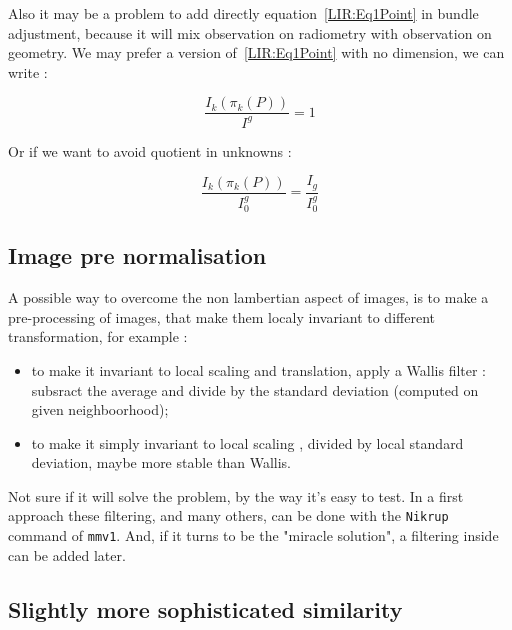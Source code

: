 Also it may be a problem to add directly equation~\ref{LIR:Eq1Point} in bundle
adjustment, because it will mix observation on radiometry with observation on
geometry.  We may prefer a version of~\ref{LIR:Eq1Point} with no dimension,
we can write :

\begin{equation}
    \frac{I_k(\pi_k(P))}{I^g} = 1
\end{equation}

Or if we want to avoid quotient in unknowns :

\begin{equation}
    \frac{I_k(\pi_k(P))}{I^g_0} = \frac{I_g}{I^g_0} 
\end{equation}


\subsection{Image pre normalisation}

A possible way to  overcome the non lambertian aspect of images,
is to make a pre-processing of images, that make them localy invariant
to different transformation, for example :

\begin{itemize}
    \item to make it invariant to local scaling and translation, apply a Wallis filter : subsract the average and divide by the
          standard deviation (computed on given neighboorhood);

    \item   to make it simply invariant to local scaling ,  divided by local standard deviation, maybe more stable than
            Wallis.
\end{itemize}

Not sure if it will solve the problem, by the way it's easy to test.  
In a first approach these filtering, and many others, can be done with
the {\tt Nikrup}  command of {\tt mmv1}. And, if it turns to be the  "miracle solution",
a  filtering inside \PPP can be added later.  





\subsection{Slightly more sophisticated similarity}

